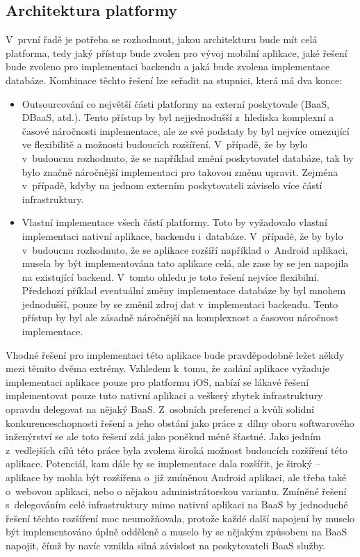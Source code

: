 \subsection{Architektura platformy}\label{platform-architecture}

V~první řadě je potřeba se rozhodnout, jakou architekturu bude mít celá platforma, tedy jaký přístup bude zvolen pro vývoj mobilní aplikace, jaké řešení bude zvoleno pro implementaci backendu a jaká bude zvolena implementace databáze. Kombinace těchto řešení lze seřadit na stupnici, která má dva konce:
\begin{itemize}
\item Outsourcování co největší části platformy na externí poskytovale (BaaS, DBaaS, atd.). Tento přístup by byl nejjednodušší z~hlediska komplexní a časové náročnosti implementace, ale ze své podstaty by byl nejvíce omezující ve flexibilitě a možnosti budoucích rozšíření. V~případě, že by bylo v~budoucnu rozhodnuto, že se například změní poskytovatel databáze, tak by bylo značně náročnější implementaci pro takovou změnu upravit. Zejména v~případě, kdyby na jednom externím poskytovateli záviselo více částí infrastruktury.
\item Vlastní implementace všech částí platformy. Toto by vyžadovalo vlastní implementaci nativní aplikace, backendu i~databáze. V~případě, že by bylo v~budoucnu rozhodnuto, že se aplikace rozšíří například o~Android aplikaci, musela by být implementována tato aplikace celá, ale zase by se jen napojila na existující backend. V~tomto ohledu je toto řešení nejvíce flexibilní. Předchozí příklad eventuální změny implementace databáze by byl mnohem jednodušší, pouze by se změnil zdroj dat v~implementaci backendu. Tento přístup by byl ale zásadně náročnější na komplexnost a časovou náročnost implementace. 
\end{itemize}

Vhodné řešení pro implementaci této aplikace bude pravděpodobně ležet někdy mezi těmito dvěma extrémy. Vzhledem k~tomu, že zadání aplikace vyžaduje implementaci aplikace pouze pro platformu iOS, nabízí se lákavé řešení implementovat pouze tuto nativní aplikaci a veškerý zbytek infrastruktury opravdu delegovat na nějaký BaaS. Z~osobních preferencí a kvůli solidní konkurenceschopnosti řešení a jeho obstání jako práce z~dílny oboru softwarového inženýrství se ale toto řešení zdá jako poněkud méně šťastné. Jako jedním z~vedlejších cílů této práce byla zvolena široká možnost budoucích rozšíření této aplikace. Potenciál, kam dále by se implementace dala rozšířit, je široký – aplikace by mohla být rozšířena o~již zmíněnou Android aplikaci, ale třeba také o~webovou aplikaci, nebo o nějakou administrátorskou variantu. Zmíněné řešení s~delegováním celé infrastruktury mimo nativní aplikaci na BaaS by jednoduché řešení těchto rozšíření moc neumožňovala, protože každé další napojení by muselo být implementováno úplně odděleně a muselo by se nějakým způsobem na BaaS napojit, čímž by navíc vznikla silná závislost na poskytovateli BaaS služby.

